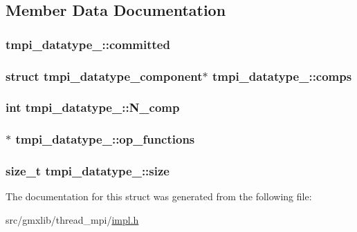 \subsection{\-Member \-Data \-Documentation}
\hypertarget{structtmpi__datatype___a0b8f7ca64dc30743c99d26f880be15d2}{
\subsubsection[{committed}]{ {\bf tmpi\-\_\-datatype\-\_\-\-::committed}}}\label{structtmpi__datatype___a0b8f7ca64dc30743c99d26f880be15d2}
\hypertarget{structtmpi__datatype___aece2997dc2ee6ffcc727ee29a5266cf5}{
\subsubsection[{comps}]{\setlength{\rightskip}{0pt plus 5cm}struct {\bf tmpi\-\_\-datatype\-\_\-component}$\ast$ {\bf tmpi\-\_\-datatype\-\_\-\-::comps}}}\label{structtmpi__datatype___aece2997dc2ee6ffcc727ee29a5266cf5}
\hypertarget{structtmpi__datatype___a04426ad6c89fb0144b3e44cfa8b51052}{
\subsubsection[{\-N\-\_\-comp}]{\setlength{\rightskip}{0pt plus 5cm}int {\bf tmpi\-\_\-datatype\-\_\-\-::\-N\-\_\-comp}}}\label{structtmpi__datatype___a04426ad6c89fb0144b3e44cfa8b51052}
\hypertarget{structtmpi__datatype___a74948602e4ec1b81fcb5082c4e3c2bcc}{
\subsubsection[{op\-\_\-functions}]{$\ast$ {\bf tmpi\-\_\-datatype\-\_\-\-::op\-\_\-functions}}}\label{structtmpi__datatype___a74948602e4ec1b81fcb5082c4e3c2bcc}
\hypertarget{structtmpi__datatype___ab262caa9036ae8a98b3ac73535b14fef}{
\subsubsection[{size}]{\setlength{\rightskip}{0pt plus 5cm}size\-\_\-t {\bf tmpi\-\_\-datatype\-\_\-\-::size}}}\label{structtmpi__datatype___ab262caa9036ae8a98b3ac73535b14fef}


\-The documentation for this struct was generated from the following file\-:\begin{DoxyCompactItemize}
\item 
src/gmxlib/thread\-\_\-mpi/\hyperlink{impl_8h}{impl.\-h}\end{DoxyCompactItemize}
